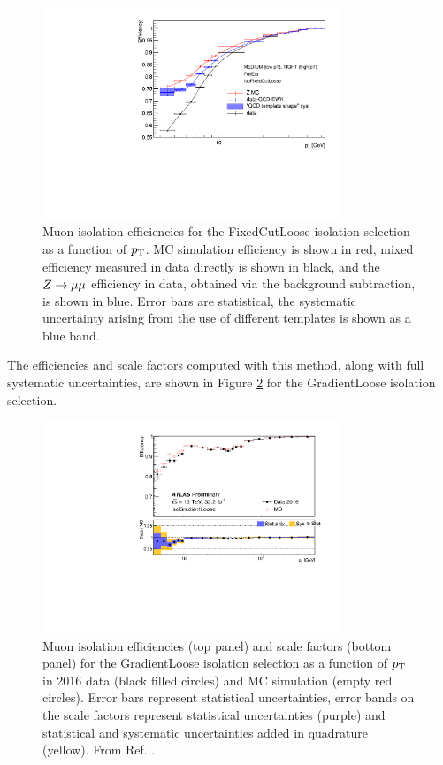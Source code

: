 \begin{figure}[h!]
  \centering
  \includegraphics[width=0.8\textwidth]{figures/muons/subtraction}
  \caption[Muon isolation efficiencies.]{Muon isolation efficiencies
  for the FixedCutLoose isolation selection as a function of $p_{\text{T}}$.
  MC simulation efficiency is shown in red, mixed efficiency measured
  in data directly is shown in black, and the $Z \rightarrow \mu\mu$ efficiency
  in data, obtained via the background subtraction, is shown in blue.
  Error bars are statistical, the systematic uncertainty arising from
  the use of different templates is shown as a blue band.}
  \label{fig:muon:sub}
\end{figure}
The efficiencies and scale factors computed with this method, along with
full systematic uncertainties, are shown in Figure \ref{fig:muon:sf} for
the GradientLoose isolation selection.
\begin{figure}[h!]
  \centering
  \includegraphics[width=0.8\textwidth]{figures/muons/sf}
  \caption[Muon isolation scale factors.]{Muon isolation efficiencies
  (top panel) and scale factors (bottom panel) for the GradientLoose
  isolation selection as a function of $p_{\text{T}}$ in 2016 data (black filled
  circles) and MC simulation (empty red circles). Error bars represent
  statistical uncertainties, error bands on the scale factors represent
  statistical uncertainties (purple) and statistical and systematic
  uncertainties added in quadrature (yellow).
  From Ref. \cite{Zgubic:2293041}.}
  \label{fig:muon:sf}
\end{figure}
